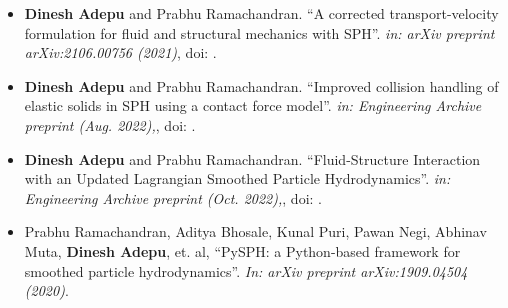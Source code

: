 %
%



\begin{itemize}
\item \textbf{Dinesh Adepu} and Prabhu Ramachandran. ``A corrected transport-velocity
formulation for fluid and structural mechanics with SPH''. \emph{in: arXiv preprint
arXiv:2106.00756 (2021)}, doi: .

\item \textbf{Dinesh Adepu} and Prabhu Ramachandran. ``Improved collision
  handling of elastic solids in SPH using a contact force model''. \emph{in:
    Engineering Archive preprint (Aug. 2022),}, doi: .

\item \textbf{Dinesh Adepu} and Prabhu Ramachandran. ``Fluid-Structure
  Interaction with an Updated Lagrangian Smoothed Particle Hydrodynamics''.
  \emph{in: Engineering Archive preprint (Oct. 2022),}, doi: .

\item Prabhu Ramachandran, Aditya Bhosale, Kunal Puri, Pawan Negi, Abhinav Muta,
  \textbf{Dinesh Adepu}, et. al, ``PySPH: a Python-based framework for smoothed particle
  hydrodynamics''. \emph{In: arXiv preprint arXiv:1909.04504 (2020)}.

\end{itemize}
